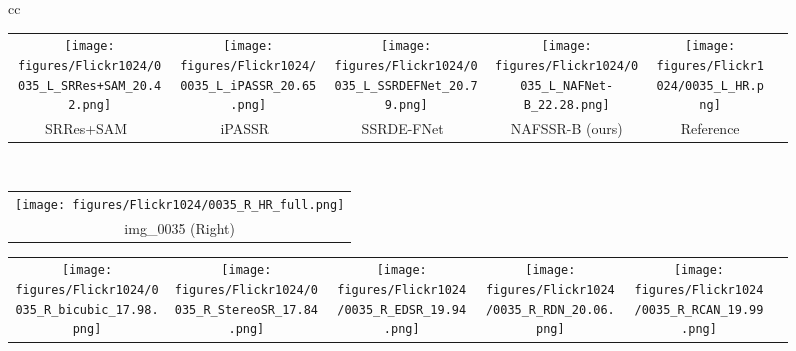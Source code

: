 \documentclass[10pt,twocolumn,letterpaper]{article}
\begin{document}
\begin{figure*}[t]
\begin{tabular}{cc}
\begin{adjustbox}{valign=t}
\begin{tabular}{cccccc}
\texttt{[image: figures/Flickr1024/0035\_L\_SRRes+SAM\_20.42.png]} \hspace{-4mm} &
\texttt{[image: figures/Flickr1024/0035\_L\_iPASSR\_20.65.png]} \hspace{-4mm} &
\texttt{[image: figures/Flickr1024/0035\_L\_SSRDEFNet\_20.79.png]} \hspace{-4mm} &
\texttt{[image: figures/Flickr1024/0035\_L\_NAFNet-B\_22.28.png]} \hspace{-4mm}   &
\texttt{[image: figures/Flickr1024/0035\_L\_HR.png]} \hspace{-4mm} 
\\ 
SRRes+SAM~\cite{ying2020stereo} \hspace{-4mm} &
iPASSR~\cite{wang2021symmetric} \hspace{-4mm} &
SSRDE-FNet~\cite{dai2021feedback}  \hspace{-4mm} &
NAFSSR-B (ours) \hspace{-4mm} &
Reference \hspace{-4mm}
\\
\end{tabular}
\end{adjustbox}
\vspace{1mm}
\\

\hspace{-0.4cm}
\begin{adjustbox}{valign=t}
\begin{tabular}{c}
\texttt{[image: figures/Flickr1024/0035\_R\_HR\_full.png]}
\\
img\_0035 (Right)
\end{tabular}
\end{adjustbox}
\hspace{-0.46cm}
\begin{adjustbox}{valign=t}
\begin{tabular}{cccccc}

\texttt{[image: figures/Flickr1024/0035\_R\_bicubic\_17.98.png]} \hspace{-4mm} &
\texttt{[image: figures/Flickr1024/0035\_R\_StereoSR\_17.84.png]} \hspace{-4mm} &
\texttt{[image: figures/Flickr1024/0035\_R\_EDSR\_19.94.png]} \hspace{-4mm} &
\texttt{[image: figures/Flickr1024/0035\_R\_RDN\_20.06.png]} \hspace{-4mm} &
\texttt{[image: figures/Flickr1024/0035\_R\_RCAN\_19.99.png]} \hspace{-4mm} 
\\


\end{tabular}
\end{adjustbox}
\end{tabular}
\end{figure*}
\end{document}
